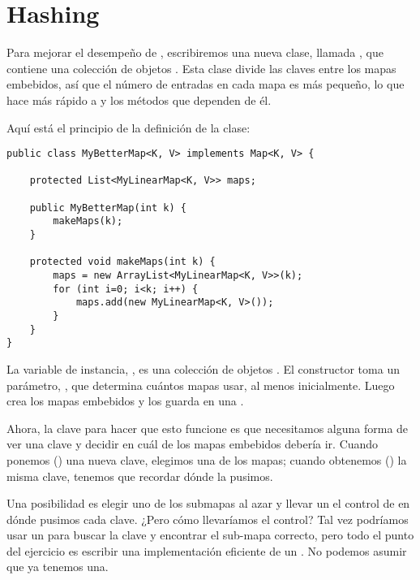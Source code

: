 \documentclass[12pt]{book}
\theoremstyle{exercise}
\begin{document}
\section{Hashing}
\label{hashing}


Para mejorar el desempeño de , escribiremos una nueva
clase, llamada , que contiene una colección de objetos
. Esta clase divide las claves entre los mapas
embebidos, así que el número de entradas en cada mapa es más pequeño,
lo que hace más rápido a  y los métodos que dependen de él.

Aquí está el principio de la definición de la clase:

\begin{verbatim}
public class MyBetterMap<K, V> implements Map<K, V> {
    
    protected List<MyLinearMap<K, V>> maps;
    
    public MyBetterMap(int k) {
        makeMaps(k);
    }

    protected void makeMaps(int k) {
        maps = new ArrayList<MyLinearMap<K, V>>(k);
        for (int i=0; i<k; i++) {
            maps.add(new MyLinearMap<K, V>());
        }
    }
}
\end{verbatim}

La variable de instancia, , es una colección de
objetos . El constructor toma un parámetro,
, que determina cuántos mapas usar, al menos inicialmente.
Luego  crea los mapas embebidos y los guarda en una
.


Ahora, la clave para hacer que esto funcione es que necesitamos alguna forma
de ver una clave y decidir en cuál de los mapas embebidos debería ir. Cuando
ponemos () una nueva clave, elegimos una de los mapas; cuando
obtenemos () la misma clave, tenemos que recordar dónde la pusimos.


Una posibilidad es elegir uno de los submapas al azar y llevar un
el control de en dónde pusimos cada clave. ¿Pero cómo llevaríamos el
control? Tal vez podríamos usar un  para buscar la clave y encontrar
el sub-mapa correcto, pero todo el punto del ejercicio es escribir una
implementación eficiente de un . No podemos asumir que ya
tenemos una.
\end{document}
